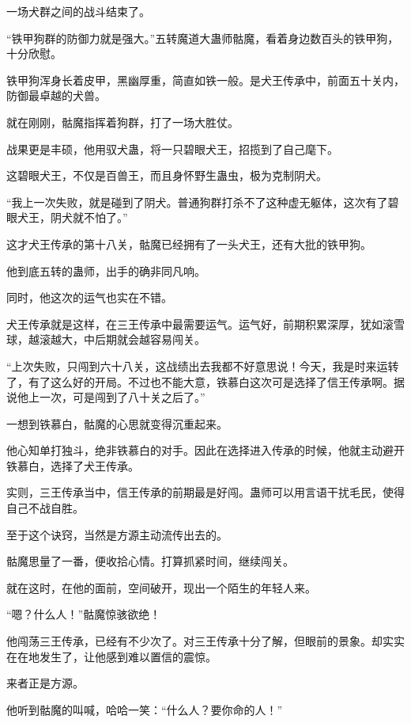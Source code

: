 
\begin{this_body}



一场犬群之间的战斗结束了。

“铁甲狗群的防御力就是强大。”五转魔道大蛊师骷魔，看着身边数百头的铁甲狗，十分欣慰。

铁甲狗浑身长着皮甲，黑幽厚重，简直如铁一般。是犬王传承中，前面五十关内，防御最卓越的犬兽。

就在刚刚，骷魔指挥着狗群，打了一场大胜仗。

战果更是丰硕，他用驭犬蛊，将一只碧眼犬王，招揽到了自己麾下。

这碧眼犬王，不仅是百兽王，而且身怀野生蛊虫，极为克制阴犬。

“我上一次失败，就是碰到了阴犬。普通狗群打杀不了这种虚无躯体，这次有了碧眼犬王，阴犬就不怕了。”

这才犬王传承的第十八关，骷魔已经拥有了一头犬王，还有大批的铁甲狗。

他到底五转的蛊师，出手的确非同凡响。

同时，他这次的运气也实在不错。

犬王传承就是这样，在三王传承中最需要运气。运气好，前期积累深厚，犹如滚雪球，越滚越大，中后期就会越容易闯关。

“上次失败，只闯到六十八关，这战绩出去我都不好意思说！今天，我是时来运转了，有了这么好的开局。不过也不能大意，铁慕白这次可是选择了信王传承啊。据说他上一次，可是闯到了八十关之后了。”

一想到铁慕白，骷魔的心思就变得沉重起来。

他心知单打独斗，绝非铁慕白的对手。因此在选择进入传承的时候，他就主动避开铁慕白，选择了犬王传承。

实则，三王传承当中，信王传承的前期最是好闯。蛊师可以用言语干扰毛民，使得自己不战自胜。

至于这个诀窍，当然是方源主动流传出去的。

骷魔思量了一番，便收拾心情。打算抓紧时间，继续闯关。

就在这时，在他的面前，空间破开，现出一个陌生的年轻人来。

“嗯？什么人！”骷魔惊骇欲绝！

他闯荡三王传承，已经有不少次了。对三王传承十分了解，但眼前的景象。却实实在在地发生了，让他感到难以置信的震惊。

来者正是方源。

他听到骷魔的叫喊，哈哈一笑：“什么人？要你命的人！”


\end{this_body}
